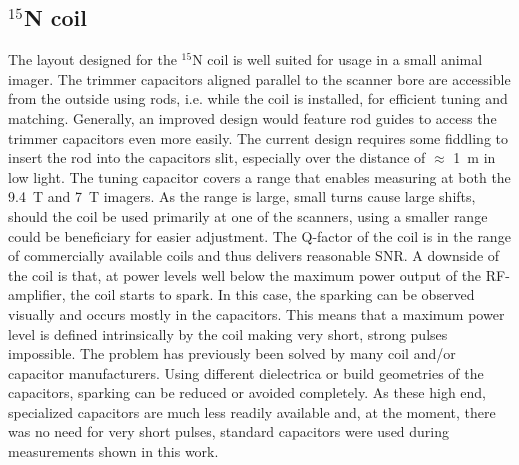         \subsection{$^{15}$N coil}
            The layout designed for the $^{15}$N coil is well suited for usage in a small animal imager. The trimmer capacitors aligned parallel to the scanner bore are accessible from the outside using rods, i.e. while the coil is installed, for efficient tuning and matching. Generally, an improved design would feature rod guides to access the trimmer capacitors even more easily. The current design requires some fiddling to insert the rod into the capacitors slit, especially over the distance of $\approx$ \SI{1}{\meter} in low light.
            The tuning capacitor covers a range that enables measuring at both the \SI{9.4}{\tesla} and \SI{7}{\tesla} imagers. As the range is large, small turns cause large shifts, should the coil be used primarily at one of the scanners, using a smaller range could be beneficiary for easier adjustment.
            The Q-factor of the coil is in the range of commercially available coils and thus delivers reasonable SNR.
            A downside of the coil is that, at power levels well below the maximum power output of the RF-amplifier, the coil starts to spark. In this case, the sparking can be observed visually and occurs mostly in the capacitors. This means that a maximum power level is defined intrinsically by the coil making very short, strong pulses impossible. The problem has previously been solved by many coil and/or capacitor manufacturers. Using different dielectrica or build geometries of the capacitors, sparking can be reduced or avoided completely. As these high end, specialized capacitors are much less readily available and, at the moment, there was no need for very short pulses, standard capacitors were used during measurements shown in this work.
